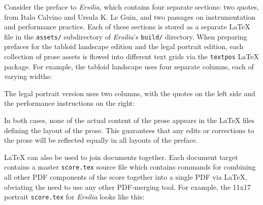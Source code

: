 Consider the preface to \emph{Ersilia}, which contains four separate sections:
two quotes, from Italo Calvino and Ursula K. Le Guin, and two passages on
instrumentation and performance practice. Each of these sections is stored as a
separate LaTeX file in the \texttt{assets/} subdirectory of \emph{Ersilia}'s
\texttt{build/} directory. When preparing prefaces for the tabloid landscape
edition and the legal portrait edition, each collection of prose assets is
flowed into different text grids via the \texttt{textpos} LaTeX package. For
example, the tabloid landscape uses four separate columns, each of varying
widths:


\noindent The legal portrait version uses two columns, with the quotes on the
left side and the performance instructions on the right:


\noindent In both cases, none of the actual content of the prose appears in the
LaTeX files defining the layout of the prose. This guarantees that any edits or
corrections to the prose will be reflected equally in all layouts of the
preface.

LaTeX can also be used to join documents together. Each document target
contains a master \texttt{score.tex} source file which contains commands for
combining all other PDF components of the score together into a single PDF via
LaTeX, obviating the need to use any other PDF-merging tool. For example, the
11x17 portrait \texttt{score.tex} for \emph{Ersilia} looks like this:

\begin{singlespacing}
\vspace{-0.5\baselineskip}
\inputminted{tex}{../../Documents/Scores/ersilia/ersilia/build/11x17-portrait/ersilia-11x17-portrait-score.tex}
\end{singlespacing}

